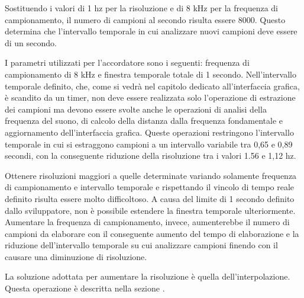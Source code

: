 Sostituendo i valori di 1 hz per la risoluzione e di 8 kHz per la frequenza di campionamento, il numero di campioni al secondo risulta essere 8000. 
Questo determina che l'intervallo temporale in cui analizzare nuovi campioni deve essere di un secondo.

I parametri utilizzati per l'accordatore sono i seguenti: frequenza di campionamento di 8 kHz e finestra temporale totale di 1 secondo. 
Nell'intervallo temporale definito, che, come si vedrà nel capitolo dedicato all'interfaccia grafica, è scandito da un timer, non deve essere realizzata solo l'operazione di estrazione dei campioni ma devono essere svolte anche le operazioni di analisi della frequenza del suono, di calcolo della distanza dalla frequenza fondamentale e aggiornamento dell'interfaccia grafica. 
Queste operazioni restringono l'intervallo temporale in cui si estraggono campioni a un intervallo variabile tra 0,65 e 0,89 secondi, con la conseguente riduzione della risoluzione tra i valori 1.56 e 1,12 hz.

Ottenere risoluzioni maggiori a quelle determinate variando solamente frequenza di campionamento e intervallo temporale e rispettando il vincolo di tempo reale definito risulta essere molto difficoltoso. 
A causa del limite di 1 secondo definito dallo sviluppatore, non è possibile estendere la finestra temporale ulteriormente.
Aumentare la frequenza di campionamento, invece, aumenterebbe il numero di campioni da elaborare con il conseguente aumento del tempo di elaborazione e la riduzione dell'intervallo temporale su cui analizzare campioni finendo con il causare una diminuzione di risoluzione.

La soluzione adottata per aumentare la risoluzione è quella dell'interpolazione.
Questa operazione è descritta nella sezione .

